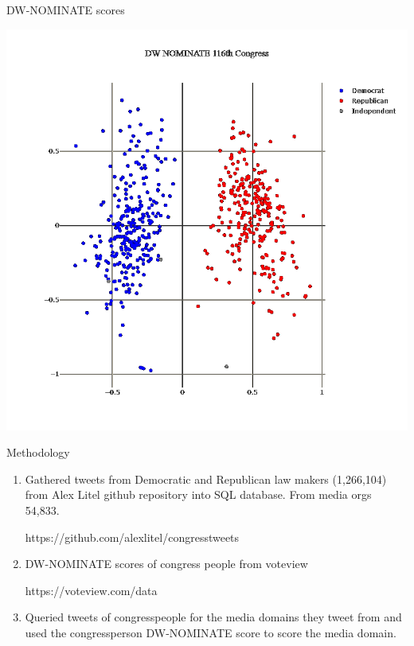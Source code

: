 \documentclass[12pt]{article}
\theoremstyle{example}
\theoremstyle{defn}
\begin{document}
\vspace*{\fill}

\vfill

\clearpage

{\large DW-NOMINATE scores}

\vspace*{-5pt}
\hspace*{\fill}
\includegraphics[scale=0.2]{dwnominate_pic_white.png}
\hspace*{\fill}

\clearpage

{\large Methodology}

\vspace*{-16pt}
\begin{enumerate}
\item Gathered tweets from Democratic and Republican law makers (1,266,104) from Alex Litel github repository into SQL database.  From media orgs 54,833.

https://github.com/alexlitel/congresstweets

\item DW-NOMINATE scores of congress people from voteview

https://voteview.com/data
\item Queried tweets of congresspeople for the media domains they tweet from and used the congressperson DW-NOMINATE score to score the media domain.
\end{enumerate}
\end{document}
